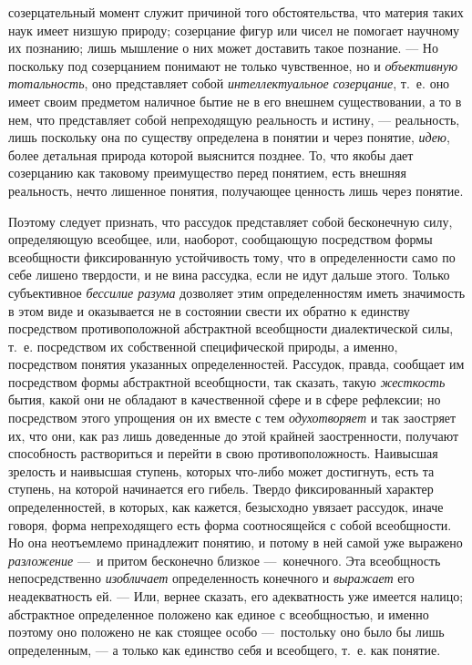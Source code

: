 \documentclass[twoside]{article}
\begin{document}
{{созерцательный момент служит причиной того обстоятельства, что материя
таких наук имеет низшую природу; созерцание фигур или чисел не помогает
научному их познанию; лишь мышление о них может доставить такое познание.
— Но поскольку под созерцанием понимают не только
чувственное, но и {\em объективную
тотальность}, оно представляет собой
{\em интеллектуальное созерцание},
т.~е. оно имеет своим предметом наличное бытие не в его
внешнем существовании, а то в нем, что представляет собой непреходящую
реальность и истину, — реальность, лишь поскольку она по
существу определена в понятии и через понятие,
{\em идею}, более
детальная природа которой выяснится позднее. То, что якобы дает созерцанию
как таковому преимущество перед понятием, есть внешняя реальность, нечто
лишенное понятия, получающее ценность лишь через понятие.

Поэтому следует признать, что рассудок представляет собой
бесконечную силу, определяющую всеобщее, или, наоборот, сообщающую
посредством формы всеобщности фиксированную устойчивость тому, что в
определенности само по себе лишено твердости, и не вина
рассудка, если не идут дальше этого. Только субъективное
{\em бессилие разума}
дозволяет этим определенностям иметь значимость в этом виде и
оказывается не в состоянии свести их обратно к единству посредством
противоположной абстрактной всеобщности диалектической силы, т.~е.
посредством их собственной специфической природы, а именно, посредством
понятия указанных определенностей. Рассудок, правда, сообщает им
посредством формы абстрактной всеобщности, так сказать, такую
{\em жесткость} бытия,
какой они не обладают в качественной сфере и в сфере рефлексии; но
посредством этого упрощения он их вместе с тем
{\em одухотворяет} и так
заостряет их, что они, как раз лишь доведенные до этой крайней
заостренности, получают способность раствориться и перейти в свою
противоположность. Наивысшая зрелость и наивысшая ступень, которых что-либо
может достигнуть, есть та ступень, на которой начинается его гибель. Твердо
фиксированный характер определенностей, в которых, как кажется, безысходно
увязает рассудок, иначе говоря, форма непреходящего есть форма
соотносящейся с собой всеобщности. Но она неотъемлемо принадлежит понятию,
и потому в ней самой уже выражено
{\em разложение} —~и
притом бесконечно близкое —~конечного. Эта всеобщность
непосредственно {\em изобличает}
определенность конечного и
{\em выражает} его
неадекватность ей. — Или, вернее сказать, его адекватность
уже имеется налицо; абстрактное определенное положено как единое с
всеобщностью, и именно поэтому оно положено не как стоящее особо
—~постольку оно было бы лишь определенным, — а
только как единство себя и всеобщего, т.~е. как понятие.

}}
\end{document}
